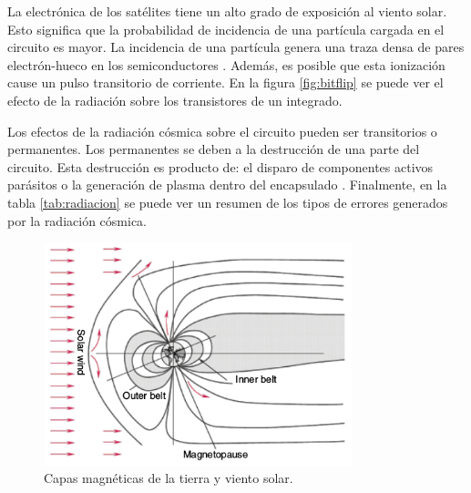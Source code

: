 La electrónica de los satélites tiene un alto grado de exposición al viento solar.
Esto significa que la probabilidad de incidencia de una partícula cargada en el circuito es mayor.
La incidencia de una partícula genera una traza densa de pares electrón-hueco en los semiconductores \citep{ARTICLE:velazco}.
Además, es posible que esta ionización cause un pulso transitorio de corriente.
En la figura \ref{fig:bitflip} se puede ver el efecto de la radiación sobre los transistores de un integrado.

Los efectos de la radiación cósmica sobre el circuito pueden ser transitorios o permanentes.
Los permanentes se deben a la destrucción de una parte del circuito.
Esta destrucción es producto de: el disparo de componentes activos parásitos o la generación de plasma dentro del encapsulado \citep{WEBSITE:effects_on_devices}.
Finalmente, en la tabla \ref{tab:radiacion} se puede ver un resumen de los tipos de errores generados por la radiación cósmica.

\newpage

\vfill
\begin{figure}[htbp]
	\centering
	\includegraphics[width=0.8\textwidth]{./Figures/vientosolar.jpg}
    \caption{Capas magnéticas de la tierra y viento solar\protect\footnotemark.}
	\label{fig:viento}
\end{figure}


\vfill

